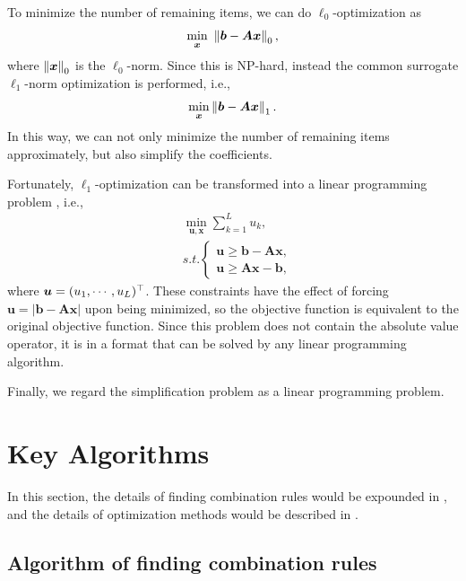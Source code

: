 To minimize the number of remaining items, we can do $\ell_0$-optimization as 
\begin{equation}
    \underset{\bm x}\min~\left\Vert\bm{b}-\bm{A}\bm{x}\right\Vert_0,
\end{equation}
where $\left\Vert\bm x\right\Vert_0$ is the $\ell_0$-norm. Since this is NP-hard, instead the common surrogate $\ell_1$-norm optimization is performed, i.e.,
\begin{equation}
\underset{\bm x}\min\left\Vert\bm{b}-\bm{A}\bm{x}\right\Vert_1.
\label{LAE}
\end{equation}
In this way, we can not only minimize the number of remaining items approximately, but also simplify the coefficients. 

Fortunately, $\ell_1$-optimization can be transformed into a linear programming problem 
\citep[pp. 195--196]{L1_regression}, i.e.,
\begin{equation}
\begin{split}
&\underset{\bm u,\bm x}\min \sum_{k=1}^L{u_k},\\
&s.t. \left\{
\begin{matrix}
\bm{u}\ge \bm{b}-\bm{A}\bm{x},\\ 
\bm{u}\ge \bm{A}\bm{x}-\bm{b},
\end{matrix}
\right.
\end{split}
\label{LP}
\end{equation}
where $\bm u=(u_1,\cdots,u_L)^\top$. These constraints have the effect of forcing $\bm u = |\bm{b}-\bm{A}\bm{x}|$ upon being minimized, so the objective function is equivalent to the original objective function. Since this problem does not contain the absolute value operator, it is in a format that can be solved by any linear programming algorithm.

Finally, we regard the simplification problem as a linear programming problem. 


\section{Key Algorithms} \label{Details-03}
In this section, the details of finding combination rules would be expounded in , and the details of optimization methods would be described in .

\subsection{Algorithm of finding combination rules} \label{Combine-03}

